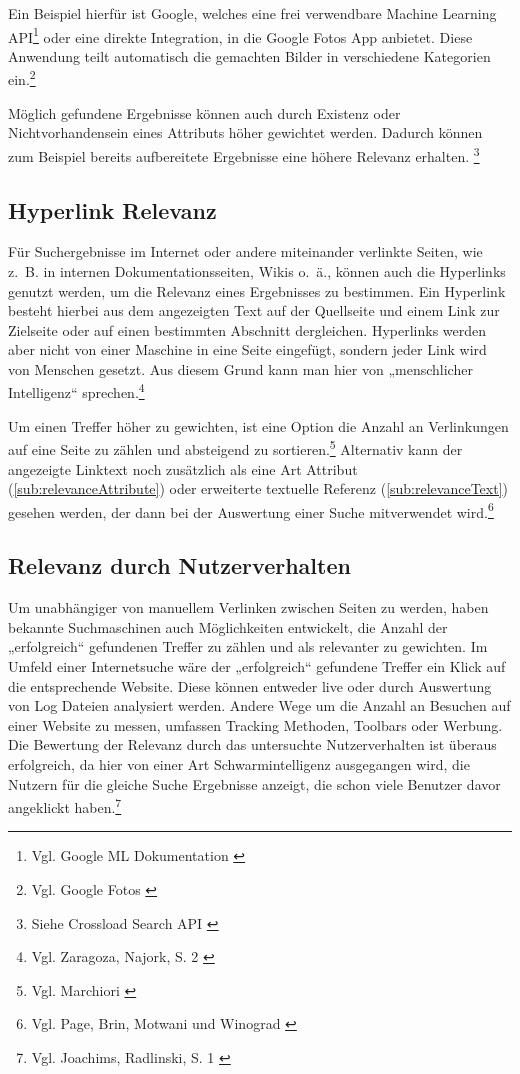 Ein Beispiel hierfür ist Google, welches eine frei verwendbare Machine Learning API\footnote{Vgl. Google ML Dokumentation \cite{googledevelopers2022}} oder eine direkte Integration, in die Google Fotos App anbietet. Diese Anwendung teilt automatisch die gemachten Bilder in verschiedene Kategorien ein.\footnote{Vgl. Google Fotos \cite{googlephotos2022}}

Möglich gefundene Ergebnisse können auch durch Existenz oder Nichtvorhandensein eines Attributs höher gewichtet werden.
Dadurch können zum Beispiel bereits aufbereitete Ergebnisse eine höhere Relevanz erhalten. \footnote{Siehe Crossload Search API \cite{crossload2022}}

\subsection{Hyperlink Relevanz}
\label{sub:relevanceHyperlink}
Für Suchergebnisse im Internet oder andere miteinander verlinkte Seiten, wie z. B. in internen Dokumentationsseiten, Wikis o. ä., können auch die Hyperlinks genutzt werden, um die Relevanz eines Ergebnisses zu bestimmen.
Ein Hyperlink besteht hierbei aus dem angezeigten Text auf der Quellseite und einem Link zur Zielseite oder auf einen bestimmten Abschnitt dergleichen.
Hyperlinks werden aber nicht von einer Maschine in eine Seite eingefügt, sondern jeder Link wird von Menschen gesetzt.
Aus diesem Grund kann man hier von „menschlicher Intelligenz“ sprechen.\footnote{Vgl. Zaragoza, Najork, S. 2 \cite{zaragoza2018}}

Um einen Treffer höher zu gewichten, ist eine Option die Anzahl an Verlinkungen auf eine Seite zu zählen und absteigend zu sortieren.\footnote{Vgl. Marchiori \cite{marchiori1997}}
Alternativ kann der angezeigte Linktext noch zusätzlich als eine Art Attribut (\ref{sub:relevanceAttribute}) oder erweiterte textuelle Referenz (\ref{sub:relevanceText}) gesehen werden, der dann bei der Auswertung einer Suche mitverwendet wird.\footnote{Vgl. Page, Brin, Motwani und Winograd \cite{ilprints422}}

\subsection{Relevanz durch Nutzerverhalten}
\label{sub:relevanceUser}
Um unabhängiger von manuellem Verlinken zwischen Seiten zu werden, haben bekannte Suchmaschinen auch Möglichkeiten entwickelt, die Anzahl der „erfolgreich“ gefundenen Treffer zu zählen und als relevanter zu gewichten.
Im Umfeld einer Internetsuche wäre der „erfolgreich“ gefundene Treffer ein Klick auf die entsprechende Website.
Diese können entweder live oder durch Auswertung von Log Dateien analysiert werden.
Andere Wege um die Anzahl an Besuchen auf einer Website zu messen, umfassen Tracking Methoden, Toolbars oder Werbung.
Die Bewertung der Relevanz durch das untersuchte Nutzerverhalten ist überaus erfolgreich, da hier von einer Art Schwarmintelligenz ausgegangen wird, die Nutzern für die gleiche Suche Ergebnisse anzeigt, die schon viele Benutzer davor angeklickt haben.\footnote{Vgl. Joachims, Radlinski, S. 1 \cite{joachims2007}}


